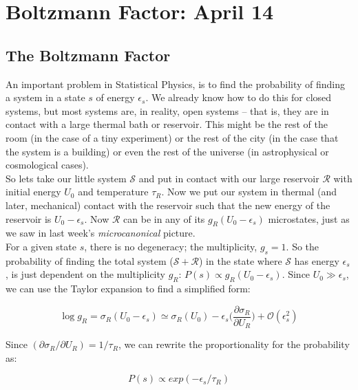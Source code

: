 \section{Boltzmann Factor: April 14}


\subsection{The Boltzmann Factor}
An important problem in Statistical Physics, is to find the probability
of finding a system in a state $s$ of energy $\epsilon_s$. We already
know how to do this for closed systems, but most systems are, in reality, open systems -- that is, they are in contact with a large thermal bath or reservoir. This might be the rest of the room (in the case of a tiny experiment) or the rest of the city (in the case that the system is a building) or even the rest of the universe (in astrophysical or cosmological cases). \\

So lets take our little system $\mathcal{S}$ and put in contact with our large reservoir $\mathcal{R}$ with initial energy $U_0$ and temperature $\tau_R$. Now we put our system in thermal (and later, mechanical) contact with the reservoir such that the new energy of the reservoir is $U_0 - \epsilon_s$. Now 
$\mathcal{R}$ can be in any of its $g_R(U_0 - \epsilon_s)$ microstates, just as we saw in last week's \textit{microcanonical} picture. \\

For a given state $s$, there is no degeneracy; the multiplicity, $g_s = 1$. So the probability of finding the total system ($\mathcal{S} + \mathcal{R}$) in the state where $\mathcal{S}$ has energy $\epsilon_s$, is just dependent on the multiplicity $g_R$: $P(s) \propto g_R(U_0 - \epsilon_s)$. Since 
$U_0 \gg \epsilon_s$, we can use the Taylor expansion to find a simplified form:

\begin{equation}
\log g_R = \sigma_R(U_0 - \epsilon_s) \simeq 
	\sigma_R(U_0) - 
	\epsilon_s \bigg(\frac{\partial \sigma_R}{\partial U_R}\bigg) +
	\mathcal{O}(\epsilon_s^2)
\end{equation}

Since $(\partial \sigma_R/\partial U_R) = 1/\tau_R$, we can rewrite the proportionality for the probability as:

\begin{equation}
P(s) \propto exp(-\epsilon_s/\tau_R)
\end{equation}

